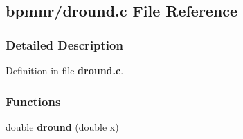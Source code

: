 \subsection{bpmnr/dround.c File Reference}
\label{dround_8c}


\subsubsection{Detailed Description}


Definition in file {\bf dround.c}.

\subsubsection*{Functions}
\begin{CompactItemize}
\item 
double {\bf dround} (double x)
\end{CompactItemize}
